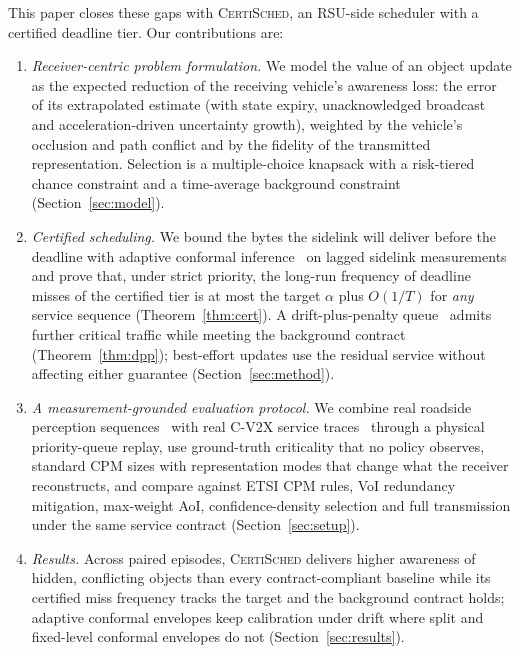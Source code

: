 \documentclass[journal]{IEEEtran}
\theoremstyle{remark}
\newcommand{\cs}{\textsc{CertiSched}}
\begin{document}
This paper closes these gaps with \cs, an RSU-side scheduler with a certified deadline tier. Our contributions are:
\begin{enumerate}
\item \emph{Receiver-centric problem formulation.} We model the value of an object update as the expected reduction of the receiving vehicle's awareness loss: the error of its extrapolated estimate (with state expiry, unacknowledged broadcast and acceleration-driven uncertainty growth), weighted by the vehicle's occlusion and path conflict and by the fidelity of the transmitted representation. Selection is a multiple-choice knapsack with a risk-tiered chance constraint and a time-average background constraint (Section~\ref{sec:model}).
\item \emph{Certified scheduling.} We bound the bytes the sidelink will deliver before the deadline with adaptive conformal inference~\cite{gibbs2021aci} on lagged sidelink measurements and prove that, under strict priority, the long-run frequency of deadline misses of the certified tier is at most the target $\alpha$ plus $O(1/T)$ for \emph{any} service sequence (Theorem~\ref{thm:cert}). A drift-plus-penalty queue~\cite{neely2010book} admits further critical traffic while meeting the background contract (Theorem~\ref{thm:dpp}); best-effort updates use the residual service without affecting either guarantee (Section~\ref{sec:method}).
\item \emph{A measurement-grounded evaluation protocol.} We combine real roadside perception sequences~\cite{v2xseq} with real C-V2X service traces~\cite{seev2x} through a physical priority-queue replay, use ground-truth criticality that no policy observes, standard CPM sizes with representation modes that change what the receiver reconstructs, and compare against ETSI CPM rules, VoI redundancy mitigation, max-weight AoI, confidence-density selection and full transmission under the same service contract (Section~\ref{sec:setup}).
\item \emph{Results.} Across \resRuns{} paired episodes, \cs{} delivers higher awareness of hidden, conflicting objects than every contract-compliant baseline while its certified miss frequency tracks the target and the background contract holds; adaptive conformal envelopes keep calibration under drift where split and fixed-level conformal envelopes do not (Section~\ref{sec:results}).
\end{enumerate}

\end{document}
